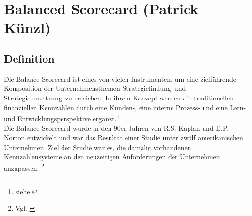 \section{Balanced Scorecard (Patrick Künzl)}
\subsection{Definition}
Die Balance Scorecard ist eines von vielen Instrumenten, um eine zielführende
Komposition der Unternehmensthemen \glqq Strategiefindung\grqq~und
\glqq Strategieumsetzung\grqq~zu erreichen. \glqq In ihrem Konzept werden die
traditionellen finanziellen Kennzahlen durch eine Kunden-, eine 
interne Prozess- und eine Lern- und Entwicklungsperspektive
ergänzt.\glqq\footnote{siehe \cite{BalanceGabler}} \\
Die Balance Scorecard wurde in den 90er-Jahren von R.S. Kaplan und D.P. Norton
entwickelt und war das Resultat einer Studie unter zwölf amerikanischen
Unternehmen. Ziel der Studie war es, die damalig vorhandenen Kennzahlensysteme
an den neuzeitigen Anforderungen der Unternehmen anzupassen. \footnote{Vgl.
\cite{BalanceGabler}}
